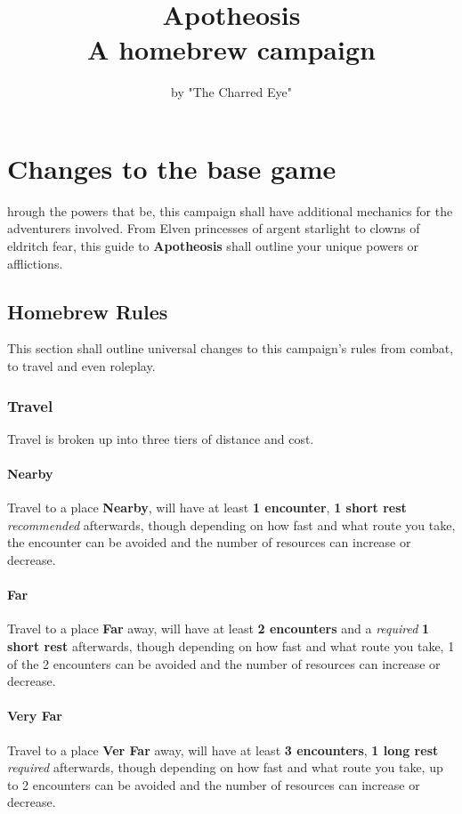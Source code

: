 \documentclass[letterpaper,twocolumn,openany,nodeprecatedcode,breakable,skins,xparse,most]{dndbook}
\title{Apotheosis \\
\large A homebrew campaign}
\author{by "The Charred Eye"}
\begin{document}
\frontmatter

\tableofcontents

\chapter{Changes to the base game}

hrough the powers that be, this campaign shall have additional mechanics for the adventurers involved. From Elven princesses of argent starlight to clowns of eldritch fear, this guide to \textbf{Apotheosis} shall outline your unique powers or afflictions.

\section{Homebrew Rules}
This section shall outline universal changes to this campaign's rules from combat, to travel and even roleplay.

\subsection{Travel}
Travel is broken up into three tiers of distance and cost.

\subsubsection{Nearby}
Travel to a place \textbf{Nearby}, will have at least \textbf{1 encounter}, \textbf{1 short rest} \textit{recommended} afterwards, though depending on how fast and what route you take, the encounter can be avoided and the number of resources can increase or decrease. 

\subsubsection{Far}
Travel to a place \textbf{Far} away, will have at least \textbf{2 encounters} and a \textit{required} \textbf{1 short rest} afterwards, though depending on how fast and what route you take, 1 of the 2 encounters can be avoided and the number of resources can increase or decrease.

\subsubsection{Very Far}
Travel to a place \textbf{Ver Far} away, will have at least \textbf{3 encounters}, \textbf{1 long rest} \textit{required} afterwards, though depending on how fast and what route you take, up to 2 encounters can be avoided and the number of resources can increase or decrease.
\end{document}
